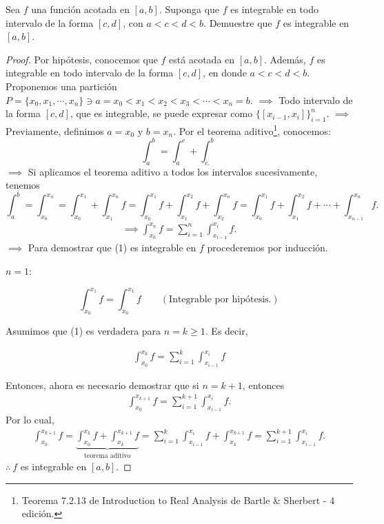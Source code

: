 \begin{problema}
	Sea $f$ una función acotada en $[a, b]$. Suponga que $f$ es integrable en todo intervalo de la forma $[c, d]$, con $a<c<d<b$. Demuestre que $f$ es integrable en $[a, b]$.
\end{problema}
\begin{proof}
	Por hipótesis, conocemos que $f$ está acotada en $[a,b]$. Además, $f$ es integrable en todo intervalo de la forma $[c,d]$, en donde $a<c<d<b$. Proponemos una partición $P=\{x_0,x_1,\cdots, x_n\} \ni a=x_0<x_1<x_2<x_3<\cdots <x_n=b$. $\implies$ Todo intervalo de la forma $[c,d]$, que es integrable, se puede expresar como $\{[x_{i-1},x_i]\}_{i=1}^n$. $\implies$ Previamente, definimos $a=x_0$ y $b=x_n$. Por el teorema aditivo\footnote{Teorema 7.2.13 de Introduction to Real Analysis de Bartle \& Sherbert - 4 edición.}, conocemos: 
	$$\int_a^b=\int_a^c+\int_{c .}^b$$
	$\implies$ Si aplicamos el teorema aditivo a todos los intervalos sucesivamente, tenemos
	$$ \int_a^b=\int_{x_0}^{x_n}= \int_{x_0}^{x_1}+ \int_{x_1}^{x_n} f=\int_{x_0}^{x_1}f+\int_{x_1}^{x_2}f+\int_{x_2}^{x_n}f=\int_{x_0}^{x_1}f+\int_{x_1}^{x_2}f+\cdots + \int_{x_{n-1}}^{x_n}f.$$
	\begin{align}
		\implies \int_{x_0}^{x_n} f = \sum_{i=1}^{n} \int_{x_{i-1}}^{x_i}f.
	\end{align}
	$\implies$ Para demostrar que (1) es integrable en $f$ procederemos por inducción. 
	
	\linita 
	
	  $n=1$: 
	
	$$\int_{x_0}^{x_1} f = \int_{x_{0}}^{x_1}f \qquad (\text{Integrable por hipótesis.})$$
	
	\linita 
	
		Asumimos que (1) es verdadera para $n=k\geq 1$. Es decir,
	
	\begin{align*}
		\int_{x_0}^{x_k} f = \sum_{i=1}^{k} \int_{x_{i-1}}^{x_i}f
	\end{align*}
	
	 Entonces, ahora es necesario demostrar que si $n=k+1$, entonces
	\begin{align*}
		\int_{x_0}^{x_{k+1}} f = \sum_{i=1}^{k+1} \int_{x_{i-1}}^{x_i}f.
	\end{align*}
Por lo cual, 
		\begin{align*}
		\int_{x_0}^{x_{k+1}} f = \underbrace{\int_{x_0}^{x_{k}} f +\int_{x_k}^{x_{k+1}} f}_{\text{teorema aditivo}} =  \sum_{i=1}^{k} \int_{x_{i-1}}^{x_i}f+\int_{x_k}^{x_{k+1}}f=  \sum_{i=1}^{k+1} \int_{x_{i-1}}^{x_i}f. 
	\end{align*}
	$\therefore \ f$ es integrable en $[a,b]$. 
\end{proof}









